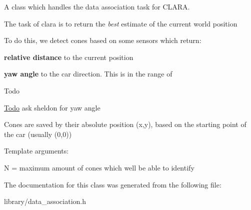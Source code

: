 A class which handles the data association task for C\+L\+A\+RA. 

The task of clara is to return the {\itshape best} estimate of the current world position

To do this, we detect cones based on some sensors which return\+:
\begin{DoxyItemize}
\item {\bfseries relative distance} to the current position
\item {\bfseries yaw angle} to the car direction. This is in the range of\begin{DoxyRefDesc}{Todo}
\item[\hyperlink{todo__todo000007}{Todo}]ask sheldon for yaw angle\end{DoxyRefDesc}

\end{DoxyItemize}

Cones are saved by their absolute position (x,y), based on the starting point of the car (usually {\ttfamily (0,0)})

Template arguments\+:
\begin{DoxyItemize}
\item {\ttfamily N} = maximum amount of cones which we\textquotesingle{}ll be able to identify 
\end{DoxyItemize}

The documentation for this class was generated from the following file\+:\begin{DoxyCompactItemize}
\item 
library/data\+\_\+association.\+h\end{DoxyCompactItemize}

